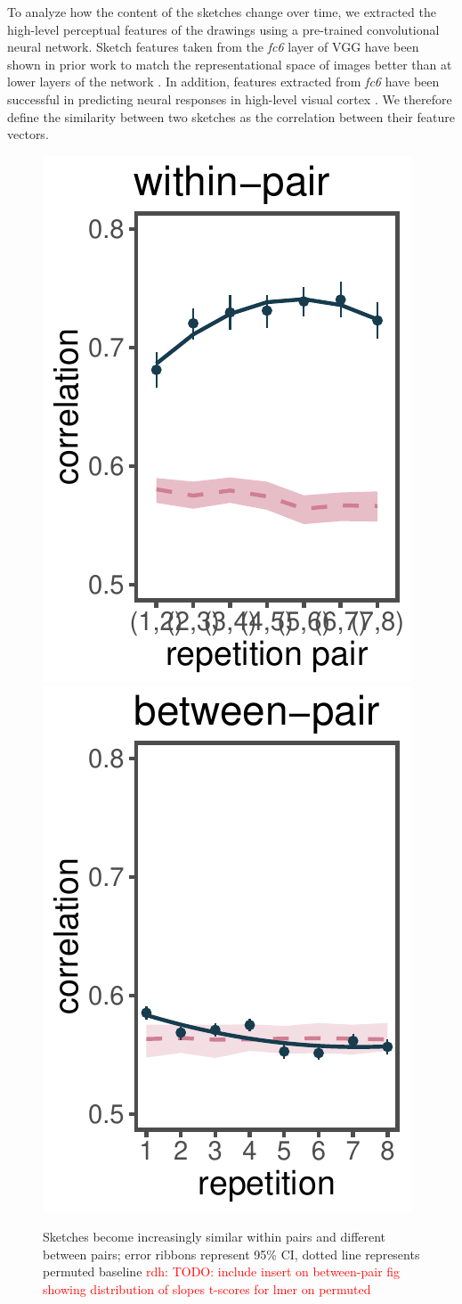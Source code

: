 \documentclass[10pt,letterpaper]{article}
\newcommand{\rdh}[1]{\textcolor{Red}{rdh: #1}}
\begin{document}
To analyze how the content of the sketches change over time, we extracted the high-level perceptual features of the drawings using a pre-trained convolutional neural network. 
Sketch features taken from the \textit{fc6} layer of VGG have been shown in prior work to match the representational space of images better than at lower layers of the network \cite{Fan18}. 
In addition, features extracted from \emph{fc6} have been successful in predicting neural responses in high-level visual cortex \cite{Yamins}.
We therefore define the similarity between two sketches as the correlation between their feature vectors.

\begin{figure}
\includegraphics[width=0.45\linewidth]{figures/within.pdf}
\includegraphics[width=0.45\linewidth]{figures/across.pdf}
\caption{Sketches become increasingly similar within pairs and different between pairs; error ribbons represent 95\% CI, dotted line represents permuted baseline \rdh{TODO: include insert on between-pair fig showing distribution of slopes t-scores for lmer on permuted}} \label{within-across}
\end{figure}
\end{document}
